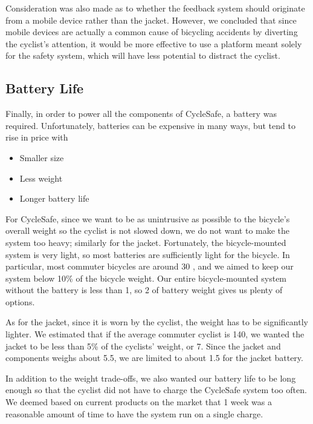 \documentclass[journal]{IEEEtran}
\begin{document}
Consideration was also made as to whether the feedback system should originate from a mobile device rather than the jacket. However, we concluded that since mobile devices are actually a common cause of bicycling accidents by diverting the cyclist's attention, it would be more effective to use a platform meant solely for the safety system, which will have less potential to distract the cyclist.

\subsection{Battery Life}

Finally, in order to power all the components of CycleSafe, a battery was required. Unfortunately, batteries can be expensive in many ways, but tend to rise in price with
\begin{itemize}
    \item Smaller size
    \item Less weight
    \item Longer battery life
\end{itemize}
For CycleSafe, since we want to be as unintrusive as possible to the bicycle's overall weight so the cyclist is not slowed down, we do not want to make the system too heavy; similarly for the jacket. Fortunately, the bicycle-mounted system is very light, so most batteries are sufficiently light for the bicycle. In particular, most commuter bicycles are around \SI{30}{\lb} \cite{bicycle_weight}, and we aimed to keep our system below 10\% of the bicycle weight. Our entire bicycle-mounted system without the battery is less than \SI{1}{\lb}, so \SI{2}{\lb} of battery weight gives us plenty of options.

As for the jacket, since it is worn by the cyclist, the weight has to be significantly lighter. We estimated that if the average commuter cyclist is \SI{140}{\lb}, we wanted the jacket to be less than 5\% of the cyclists' weight, or \SI{7}{\lb}. Since the jacket and components weighs about \SI{5.5}{\lb}, we are limited to about \SI{1.5}{\lb} for the jacket battery.

In addition to the weight trade-offs, we also wanted our battery life to be long enough so that the cyclist did not have to charge the CycleSafe system too often. We deemed based on current products on the market \cite{bicycle_lights_cygolite, bicycle_lights_niterider} that 1 week was a reasonable amount of time to have the system run on a single charge.
\end{document}
